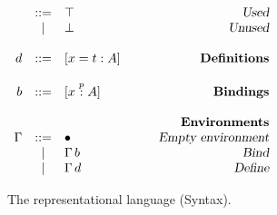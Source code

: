 \begin{figure}
\begin{center}
\begin{math}
\begin{array}{rclr}
&::=&
\top
& \qquad\textsl{Used}
\\

&|&
\bot
& \qquad\textsl{Unused}
\\
\\
d 
&::=& 
[x = t : A] 
& \qquad\textsl{\bf Definitions}
\\
\\
b
&::=& [x \stackrel{p}{:} A]
& \qquad\textsl{\bf Bindings}
\\
\\
&&&\qquad\textsl{\bf Environments}\\
\Gamma 

&::=&
\bullet
& \qquad\textsl{Empty environment}
\\

&|&
\Gamma \, b
& \qquad\textsl{Bind}
\\
&|&
\Gamma \, d
& \qquad\textsl{Define}
\\

\end{array}
\end{math}
\end{center}

\caption{The {\system} representational language (Syntax).}
\label{fig:syntax-s2}
\end{figure}
